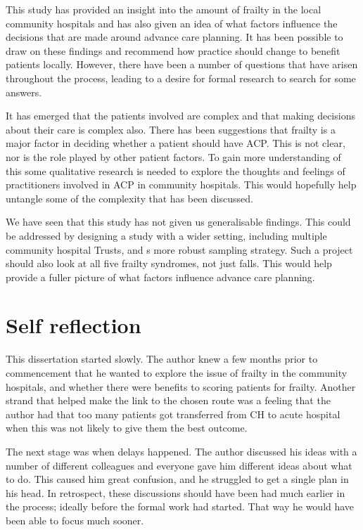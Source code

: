 \documentclass
[
	12pt,
	a4paper,
	oneside,
]{report}
\begin{document}
This study has provided an insight into the amount of frailty in the local
community hospitals and has also given an idea of what factors influence the 
decisions that are made around advance care planning. It has been possible to
draw on these findings and recommend how practice should change to benefit
patients locally. However, there have been a number of questions that have 
arisen throughout the process, leading to a desire for formal research to 
search for some answers. 

It has emerged that the patients involved are complex and that making decisions
about their care is complex also. There has been suggestions that frailty is 
a major factor in deciding whether a patient should have ACP. This is not
clear, nor is the role played by other patient factors. To gain more 
understanding of this some qualitative research is needed 
to explore the thoughts and feelings of practitioners involved in ACP in
community hospitals. This would hopefully help untangle some of the complexity
that has been discussed.

We have seen that this study has not given us generalisable findings. This
could be addressed by designing a study with a wider setting, including
multiple community hospital Trusts, and s more robust sampling strategy. 
Such a project should
also look at all five frailty syndromes, not just falls. This would help
provide a fuller picture of what factors influence advance care planning.

\section{Self reflection}

This dissertation started slowly. The author knew a few months prior to 
commencement that he wanted to explore the issue of frailty in the community
hospitals, and whether there were benefits to scoring patients for frailty.
Another strand that helped make the link to the chosen route was a feeling
that the author had that too many patients got transferred from CH to acute
hospital when this was not likely to give them the best outcome.

The next stage was when delays happened. The author discussed his ideas with
a number of different colleagues and everyone gave him different ideas about 
what to do. This caused him great confusion, and he struggled to get a single 
plan in his head. In retrospect, these discussions should have been had 
much earlier in the process; ideally before the formal work had started. That
way he would have been able to focus much sooner.
\end{document}

